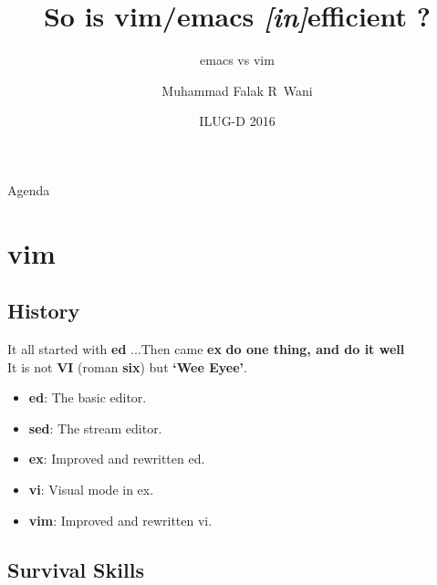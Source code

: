 \documentclass{beamer}
\title{So is vim/emacs \textit{[in]}efficient ?}
\subtitle{emacs vs vim}
\author{Muhammad Falak R~Wani \\ \inst{falakreyaz@gmail.com}}
\institute[IIIT-D] %
{
  Cybersecurity Education and Research Centre -- {\em (CERC)} \\
  Department of Computer Science\\
  IIIT-D
  \center
  \pgfuseimage{cerc-logo}
}
\date{ILUG-D 2016}
\begin{document}
\begin{frame}
	\titlepage
\end{frame}

\begin{frame}{Agenda}
	\tableofcontents
\end{frame}

\section{vim}

\subsection{History}

\begin{frame}{It all started with \textbf{ed} ...}{Then came \textbf{ex}}
	\textbf{do one thing, and do it well}\\ 
	\pause
	It is not \textbf{VI} (roman \textbf{six}) but \textbf{`Wee Eyee'}.\\
	\pause
	\begin{itemize}
		\item {
				\textbf{ed}: The basic editor.
				\pause

			}
		\item {
				\textbf{sed}: The stream editor.
				\pause

			}
		\item {
				\textbf{ex}: Improved and rewritten ed.
				\pause
			}
		\item {
				\textbf{vi}: Visual mode in ex.
				\pause
			}
		\item {
				\textbf{vim}: Improved and rewritten vi.

			}
	\end{itemize}
\end{frame}

\subsection{Survival Skills}
\end{document}
